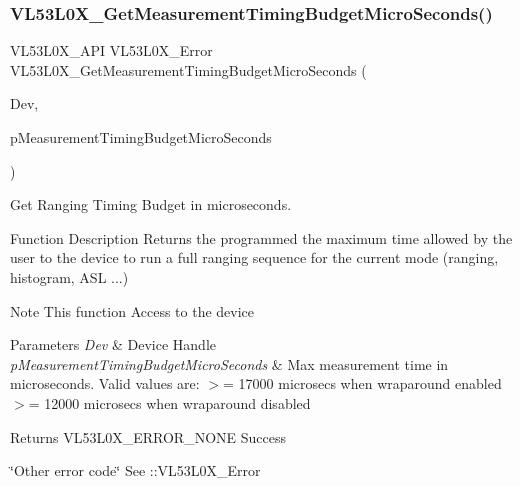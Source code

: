 \subsubsection{\texorpdfstring{V\+L53\+L0\+X\+\_\+\+Get\+Measurement\+Timing\+Budget\+Micro\+Seconds()}{VL53L0X\_GetMeasurementTimingBudgetMicroSeconds()}}
{\footnotesize\ttfamily V\+L53\+L0\+X\+\_\+\+A\+PI V\+L53\+L0\+X\+\_\+\+Error V\+L53\+L0\+X\+\_\+\+Get\+Measurement\+Timing\+Budget\+Micro\+Seconds (\begin{DoxyParamCaption}\item[{\hyperlink{group__VL53L0X__platform__group_ga2d6405308b1dd524b462f1b8fb97d167}{V\+L53\+L0\+X\+\_\+\+D\+EV}}]{Dev,  }\item[{\hyperlink{vl53l0x__types_8h_a435d1572bf3f880d55459d9805097f62}{uint32\+\_\+t} $\ast$}]{p\+Measurement\+Timing\+Budget\+Micro\+Seconds }\end{DoxyParamCaption})}



Get Ranging Timing Budget in microseconds. 

\begin{DoxyParagraph}{Function Description}
Returns the programmed the maximum time allowed by the user to the device to run a full ranging sequence for the current mode (ranging, histogram, A\+SL ...)
\end{DoxyParagraph}
\begin{DoxyNote}{Note}
This function Access to the device
\end{DoxyNote}

\begin{DoxyParams}{Parameters}
{\em Dev} & Device Handle \\
\hline
{\em p\+Measurement\+Timing\+Budget\+Micro\+Seconds} & Max measurement time in microseconds. Valid values are\+: $>$= 17000 microsecs when wraparound enabled $>$= 12000 microsecs when wraparound disabled \\
\hline
\end{DoxyParams}
\begin{DoxyReturn}{Returns}
V\+L53\+L0\+X\+\_\+\+E\+R\+R\+O\+R\+\_\+\+N\+O\+NE Success 

\char`\"{}\+Other error code\char`\"{} See \+::\+V\+L53\+L0\+X\+\_\+\+Error 
\end{DoxyReturn}
\mbox{\label{group__VL53L0X__parameters__group_ga96302da749e35322c0f031037aa457e1}} 
